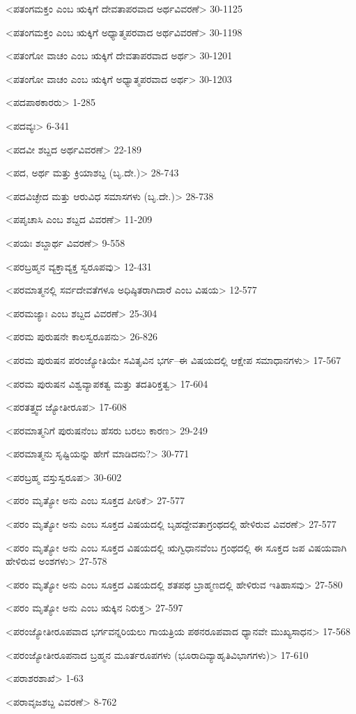 <ಪತಂಗಮಕ್ತಂ ಎಂಬ ಋಕ್ಕಿಗೆ ದೇವತಾಪರವಾದ ಅರ್ಥವಿವರಣೆ>
30-1125

<ಪತಂಗಮಕ್ತಂ ಎಂಬ ಋಕ್ಕಿಗೆ ಅಧ್ಯಾತ್ಮಪರವಾದ ಅರ್ಥವಿವರಣೆ>
30-1198

<ಪತಂಗೋ ವಾಚಂ ಎಂಬ ಋಕ್ಕಿಗೆ ದೇವತಾಪರವಾದ ಅರ್ಥ>
30-1201

<ಪತಂಗೋ ವಾಚಂ ಎಂಬ ಋಕ್ಕಿಗೆ ಅಧ್ಯಾತ್ಮಪರವಾದ ಅರ್ಥ>
30-1203

<ಪದಪಾಠಕಾರರು>
1-285

<ಪದವ್ಯಃ>
6-341

<ಪದವೀ ಶಬ್ದದ ಅರ್ಥವಿವರಣೆ>
22-189

<ಪದ, ಅರ್ಥ ಮತ್ತು ಕ್ರಿಯಾಶಬ್ದ (ಬೃ.ದೇ.)>
28-743

<ಪದವಿಚ್ಛೇದ ಮತ್ತು ಆರುವಿಧ ಸಮಾಸಗಳು (ಬೃ.ದೇ.)>
28-738

<ಪಪೃಚಾಸಿ ಎಂಬ ಶಬ್ದದ ವಿವರಣೆ>
11-209

<ಪಯಃ ಶಬ್ದಾರ್ಥ ವಿವರಣೆ>
9-558

<ಪರಬ್ರಹ್ಮನ ವ್ಯಕ್ತಾವ್ಯಕ್ತ ಸ್ವರೂಪವು>
12-431

<ಪರಮಾತ್ಮನಲ್ಲಿ ಸರ್ವದೇವತೆಗಳೂ ಅಧಿಷ್ಠಿತರಾಗಿದಾರೆ ಎಂಬ ವಿಷಯ>
12-577

<ಪರಮಜ್ಯಾಃ ಎಂಬ ಶಬ್ದದ ವಿವರಣೆ>
25-304

<ಪರಮ ಪುರುಷನೇ ಕಾಲಸ್ವರೂಪನು>
26-826

<ಪರಮ ಪುರುಷನ ಪರಂಜ್ಯೋತಿಯೇ ಸವಿತೃವಿನ ಭರ್ಗ–ಈ ವಿಷಯದಲ್ಲಿ ಆಕ್ಷೇಪ ಸಮಾಧಾನಗಳು>
17-567

<ಪರಮ ಪುರುಷನ ವಿಶ್ವವ್ಯಾಪಕತ್ವ ಮತ್ತು ತದತಿರಿಕ್ತತ್ವ>
17-604

<ಪರತತ್ತ್ವದ ಜ್ಯೋತೀರೂಪ>
17-608

<ಪರಮಾತ್ಮನಿಗೆ ಪುರುಷನೆಂಬ ಹೆಸರು ಬರಲು ಕಾರಣ>
29-249

<ಪರಮಾತ್ಮನು ಸೃಷ್ಟಿಯನ್ನು ಹೇಗೆ ಮಾಡಿದನು?>
30-771

<ಪರಬ್ರಹ್ಮ ವಸ್ತುಸ್ವರೂಪ>
30-602

<ಪರಂ ಮೃತ್ಯೋ ಅನು ಎಂಬ ಸೂಕ್ತದ ಪೀಠಿಕೆ>
27-577

<ಪರಂ ಮೃತ್ಯೋ ಅನು ಎಂಬ ಸೂಕ್ತದ ವಿಷಯದಲ್ಲಿ ಬೃಹದ್ದೇವತಾಗ್ರಂಥದಲ್ಲಿ ಹೇಳಿರುವ ವಿವರಣೆ>
27-577

<ಪರಂ ಮೃತ್ಯೋ ಅನು ಎಂಬ ಸೂಕ್ತದ ವಿಷಯದಲ್ಲಿ ಋಗ್ವಿಧಾನವೆಂಬ ಗ್ರಂಥದಲ್ಲಿ ಈ ಸೂಕ್ತದ ಜಪ ವಿಷಯವಾಗಿ ಹೇಳಿರುವ ಅಂಶಗಳು>
27-578

<ಪರಂ ಮೃತ್ಯೋ ಅನು ಎಂಬ ಸೂಕ್ತದ ವಿಷಯದಲ್ಲಿ ಶತಪಥ ಬ್ರಾಹ್ಮಣದಲ್ಲಿ ಹೇಳಿರುವ ಇತಿಹಾಸವು>
27-580

<ಪರಂ ಮೃತ್ಯೋ ಅನು ಎಂಬ ಋಕ್ಕಿನ ನಿರುಕ್ತ>
27-597

<ಪರಂಜ್ಯೋತೀರೂಪವಾದ ಭರ್ಗವನ್ನರಿಯಲು ಗಾಯತ್ರಿಯ ಪಠನರೂಪವಾದ ಧ್ಯಾನವೇ ಮುಖ್ಯಸಾಧನ>
17-568

<ಪರಂಜ್ಯೋತೀರೂಪನಾದ ಬ್ರಹ್ಮನ ಮೂರ್ತರೂಪಗಳು (ಭೂರಾದಿವ್ಯಾಹೃತಿವಿಭಾಗಗಳು)>
17-610

<ಪರಾಶರಶಾಖೆ>
1-63

<ಪರಾವೃಜಶಬ್ದ ವಿವರಣೆ>
8-762

